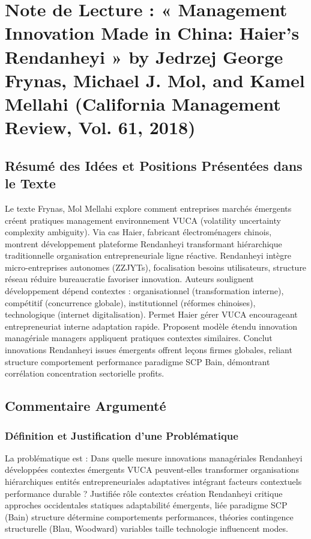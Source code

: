 \documentclass[11pt]{rapportECL}
\begin{document}
\section{Note de Lecture : « Management Innovation Made in China: Haier’s Rendanheyi » by Jedrzej George Frynas, Michael J. Mol, and Kamel Mellahi (California Management Review, Vol. 61, 2018)}

\subsection{Résumé des Idées et Positions Présentées dans le Texte}
Le texte Frynas, Mol Mellahi explore comment entreprises marchés émergents créent pratiques management environnement VUCA (volatility uncertainty complexity ambiguity). Via cas Haier, fabricant électroménagers chinois, montrent développement plateforme Rendanheyi transformant hiérarchique traditionnelle organisation entrepreneuriale ligne réactive. Rendanheyi intègre micro-entreprises autonomes (ZZJYTs), focalisation besoins utilisateurs, structure réseau réduire bureaucratie favoriser innovation. Auteurs soulignent développement dépend contextes : organisationnel (transformation interne), compétitif (concurrence globale), institutionnel (réformes chinoises), technologique (internet digitalisation). Permet Haier gérer VUCA encourageant entrepreneuriat interne adaptation rapide. Proposent modèle étendu innovation managériale managers appliquent pratiques contextes similaires. Conclut innovations Rendanheyi issues émergents offrent leçons firmes globales, reliant structure comportement performance paradigme SCP Bain, démontrant corrélation concentration sectorielle profits.

\subsection{Commentaire Argumenté}

\subsubsection{Définition et Justification d’une Problématique}
La problématique est : Dans quelle mesure innovations managériales Rendanheyi développées contextes émergents VUCA peuvent-elles transformer organisations hiérarchiques entités entrepreneuriales adaptatives intégrant facteurs contextuels performance durable ? Justifiée rôle contextes création Rendanheyi critique approches occidentales statiques adaptabilité émergents, liée paradigme SCP (Bain) structure détermine comportements performances, théories contingence structurelle (Blau, Woodward) variables taille technologie influencent modes.
\end{document}
